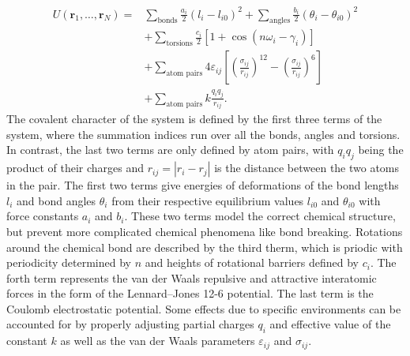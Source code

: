%
%

\begin{equation}
\begin{alignedat}{2}
  U(\mathbf{r}_1, \dots, \mathbf{r}_N) = &
  \sum_\text{bonds} \frac{a_i}{2} (l_i - l_{i0})^2
  + \sum_\text{angles} \frac{b_i}{2} (\theta_i - \theta_{i0})^2 \\
  &+ \sum_\text{torsions} \frac{c_i}{2} \left[
    1 + \cos(n \omega_i - \gamma_i)
  \right] \\
  &+ \sum_\text{atom pairs} 4 \varepsilon_{ij} \left[
    \left(\frac{\sigma_{ij}}{r_{ij}}\right)^{12}
    - \left(\frac{\sigma_{ij}}{r_{ij}}\right)^{6}
  \right] \\
  &+ \sum_\text{atom pairs} k \frac{q_i q_j}{r_{ij}}.
\end{alignedat}
\end{equation}
The covalent character of the system is defined by the first three terms of
the system, where the summation indices run over all the bonds, angles and
torsions. In contrast, the last two terms are only defined by atom pairs,
with $q_i q_j$ being the product of their charges and $r_{ij} = |r_i - r_j|$
is the distance between the two atoms in the pair. The first two terms give
energies of deformations of the bond lengths $l_i$ and bond angles $\theta_i$
from their respective equilibrium values $l_{i0}$ and $\theta_{i0}$ with force
constants $a_i$ and $b_i$. These two terms model the correct chemical
structure, but prevent more complicated chemical phenomena like bond breaking.
Rotations around the chemical bond are described by the third therm, which is
priodic with periodicity determined by $n$ and heights of rotational barriers
defined by $c_i$. The forth term represents the van der Waals repulsive and
attractive interatomic forces in the form of the Lennard–Jones 12-6 potential.
The last term is the Coulomb electrostatic potential. Some effects due to
specific environments can be accounted for by properly adjusting partial
charges $q_i$ and effective value of the constant $k$ as well as the van der
Waals parameters $\varepsilon_{ij}$ and $\sigma_{ij}$.

